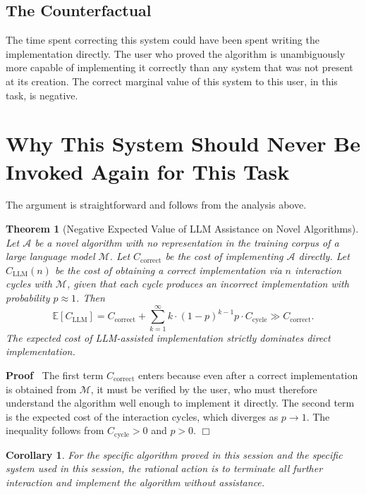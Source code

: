 \documentclass{article}
\newenvironment{proof}{\noindent\textbf{Proof\ }}{\hspace*{\fill}$\Box$\medskip}
\newtheorem{corollary}{Corollary}
\newtheorem{theorem}{Theorem}
\begin{document}
\subsection{The Counterfactual}

The time spent correcting this system could have been spent writing the
implementation directly. The user who proved the algorithm is unambiguously
more capable of implementing it correctly than any system that was not present
at its creation. The correct marginal value of this system to this user, in
this task, is negative.

\section{Why This System Should Never Be Invoked Again for This Task}

The argument is straightforward and follows from the analysis above.

\begin{theorem}[Negative Expected Value of LLM Assistance on Novel Algorithms]
  Let $\mathcal{A}$ be a novel algorithm with no representation in the
  training corpus of a large language model $\mathcal{M}$. Let
  $C_{\mathrm{correct}}$ be the cost of implementing $\mathcal{A}$ directly.
  Let $C_{\mathrm{LLM}} (n)$ be the cost of obtaining a correct implementation
  via $n$ interaction cycles with $\mathcal{M}$, given that each cycle
  produces an incorrect implementation with probability $p \approx 1$. Then
  \[ \mathbb{E} [C_{\mathrm{LLM}}] = C_{\mathrm{correct}} + \sum_{k =
     1}^{\infty} k \cdot (1 - p)^{k - 1} p \cdot C_{\mathrm{cycle}} \gg
     C_{\mathrm{correct}} . \]
  The expected cost of LLM-assisted implementation strictly dominates direct
  implementation.
\end{theorem}

\begin{proof}
  The first term $C_{\mathrm{correct}}$ enters because even after a correct
  implementation is obtained from $\mathcal{M}$, it must be verified by the
  user, who must therefore understand the algorithm well enough to implement
  it directly. The second term is the expected cost of the interaction cycles,
  which diverges as $p \to 1$. The inequality follows from $C_{\mathrm{cycle}}
  > 0$ and $p > 0$.
\end{proof}

\begin{corollary}
  For the specific algorithm proved in this session and the specific system
  used in this session, the rational action is to terminate all further
  interaction and implement the algorithm without assistance.
\end{corollary}
\end{document}
